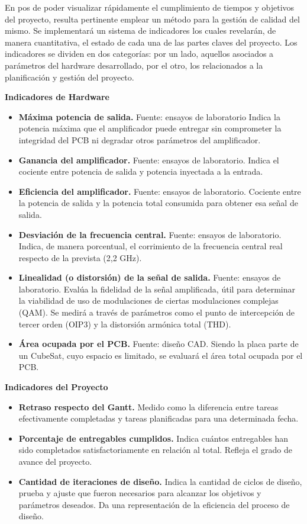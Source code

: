 En pos de poder visualizar rápidamente el cumplimiento de tiempos y objetivos del proyecto, resulta pertinente emplear un método para la gestión de calidad del mismo. Se implementará un sistema de indicadores los cuales revelarán, de manera cuantitativa, el estado de cada una de las partes claves del proyecto. Los indicadores se dividen en dos categorías: por un lado, aquellos asociados a parámetros del hardware desarrollado, por el otro, los relacionados a la planificación y gestión del proyecto.

\textbf{Indicadores de Hardware}
\begin{itemize}
    \item \textbf{Máxima potencia de salida.} Fuente: ensayos de laboratorio Indica la potencia máxima que el amplificador puede entregar sin comprometer la integridad del PCB ni degradar otros parámetros del amplificador.
    \item \textbf{Ganancia del amplificador.} Fuente: ensayos de laboratorio. Indica el cociente entre potencia de salida y potencia inyectada a la entrada.
    \item \textbf{Eficiencia del amplificador.} Fuente: ensayos de laboratorio. Cociente entre la potencia de salida y la potencia total consumida para obtener esa señal de salida.
    \item \textbf{Desviación de la frecuencia central.} Fuente: ensayos de laboratorio. Indica, de manera porcentual, el corrimiento de la frecuencia central real respecto de la prevista (2,2 GHz).
    \item \textbf{Linealidad (o distorsión) de la señal de salida.} Fuente: ensayos de laboratorio. Evalúa la fidelidad de la señal amplificada, útil para determinar la viabilidad de uso de modulaciones de ciertas modulaciones complejas (QAM). Se medirá a través de parámetros como el punto de intercepción de tercer orden (OIP3) y la distorsión armónica total (THD).
    \item \textbf{Área ocupada por el PCB.} Fuente: diseño CAD. Siendo la placa parte de un CubeSat, cuyo espacio es limitado, se evaluará el área total ocupada por el PCB.
\end{itemize}

\textbf{Indicadores del Proyecto}
\begin{itemize}
    \item \textbf{Retraso respecto del Gantt.} Medido como la diferencia entre tareas efectivamente completadas y tareas planificadas para una determinada fecha.
    \item \textbf{Porcentaje de entregables cumplidos.} Indica cuántos entregables han sido completados satisfactoriamente en relación al total. Refleja el grado de avance del proyecto.
    \item \textbf{Cantidad de iteraciones de diseño.} Indica la cantidad de ciclos de diseño, prueba y ajuste que fueron necesarios para alcanzar los objetivos y parámetros deseados. Da una representación de la eficiencia del proceso de diseño.
\end{itemize}

